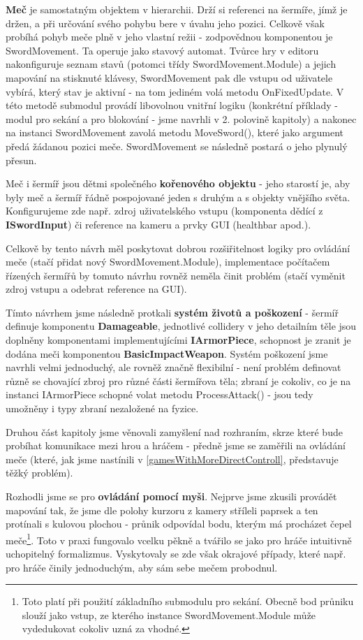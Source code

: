 \textbf{Meč} je samostatným objektem v hierarchii. Drží si referenci na šermíře, jímž je držen, a při určování svého pohybu bere v úvahu jeho pozici. Celkově však probíhá pohyb meče plně v jeho vlastní režii - zodpovědnou komponentou je SwordMovement. Ta operuje jako stavový automat. Tvůrce hry v editoru nakonfiguruje seznam stavů (potomci třídy SwordMovement.Module) a jejich mapování na stisknuté klávesy, SwordMovement pak dle vstupu od uživatele vybírá, který stav je aktivní - na tom jediném volá metodu OnFixedUpdate. V této metodě submodul provádí libovolnou vnitřní logiku (konkrétní příklady - modul pro sekání a pro blokování - jsme navrhli v 2. polovině kapitoly) a nakonec na instanci SwordMovement zavolá metodu MoveSword(), které jako argument předá žádanou pozici meče. SwordMovement se následně postará o jeho plynulý přesun. 

Meč i šermíř jsou dětmi společného \textbf{kořenového objektu} - jeho starostí je, aby byly meč a šermíř řádně pospojované jeden s druhým a s objekty vnějšího světa. Konfigurujeme zde např. zdroj uživatelského vstupu (komponenta dědící z \textbf{ISwordInput}) či reference na kameru a prvky GUI (healthbar apod.).

Celkově by tento návrh měl poskytovat dobrou rozšiřitelnost logiky pro ovládání meče (stačí přidat nový SwordMovement.Module), implementace počítačem řízených šermířů by tomuto návrhu rovněž neměla činit problém (stačí vyměnit zdroj vstupu a odebrat reference na GUI).

Tímto návrhem jsme následně protkali \textbf{systém životů a poškození} - šermíř definuje komponentu \textbf{Damageable}, jednotlivé collidery v jeho detailním těle jsou doplněny komponentami implementujícími \textbf{IArmorPiece}, schopnost je zranit je dodána meči komponentou \textbf{BasicImpactWeapon}. Systém poškození jsme navrhli velmi jednoduchý, ale rovněž značně flexibilní - není problém definovat různě se chovající zbroj pro různé části šermířova těla; zbraní je cokoliv, co je na instanci IArmorPiece schopné volat metodu ProcessAttack() - jsou tedy umožněny i typy zbraní nezaložené na fyzice.

\bigbreak

Druhou část kapitoly jsme věnovali zamyšlení nad rozhraním, skrze které bude probíhat komunikace mezi hrou a hráčem - předně jsme se zaměřili na ovládání meče (které, jak jsme nastínili v \ref{gamesWithMoreDirectControll}, představuje těžký problém).

Rozhodli jsme se pro \textbf{ovládání pomocí myši}. Nejprve jsme zkusili provádět mapování tak, že jsme dle polohy kurzoru z kamery stříleli paprsek a ten protínali s kulovou plochou - průnik odpovídal bodu, kterým má procházet čepel meče\footnote{Toto platí při použití základního submodulu pro sekání. Obecně bod průniku slouží jako vstup, ze kterého instance SwordMovement.Module může vydedukovat cokoliv uzná za vhodné.}. Toto v praxi fungovalo vcelku pěkně a tvářilo se jako pro hráče intuitivně uchopitelný formalizmus. Vyskytovaly se zde však okrajové případy, které např. pro hráče činily jednoduchým, aby sám sebe mečem probodnul.


